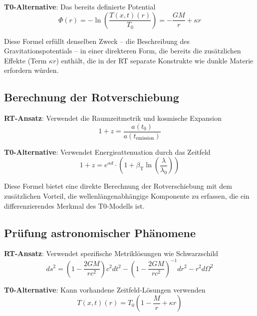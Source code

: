 \documentclass[12pt,a4paper]{article}
\newcommand{\Tfieldt}{T(x,t)}
\newcommand{\betaT}{\beta_{\text{T}}}
\newcommand{\Tzero}{T_0}
\begin{document}
	\textbf{T0-Alternative}: Das bereits definierte Potential
	\begin{equation}
		\Phi(r) = -\ln\left(\frac{\Tfieldt(r)}{\Tzero}\right) = -\frac{GM}{r} + \kappa r
	\end{equation}
	
	Diese Formel erfüllt denselben Zweck – die Beschreibung des Gravitationspotentials – in einer direkteren Form, die bereits die zusätzlichen Effekte (Term $\kappa r$) enthält, die in der RT separate Konstrukte wie dunkle Materie erfordern würden.
	
	\subsection{Berechnung der Rotverschiebung}
	\label{subsec:redshift}
	
	\textbf{RT-Ansatz}: Verwendet die Raumzeitmetrik und kosmische Expansion
	\begin{equation}
		1+z = \frac{a(t_0)}{a(t_{\text{emission}})}
	\end{equation}
	
	\textbf{T0-Alternative}: Verwendet Energieattenuation durch das Zeitfeld
	\begin{equation}
		1+z = e^{\alpha d} \cdot \left(1 + \betaT \ln\left(\frac{\lambda}{\lambda_0}\right)\right)
	\end{equation}
	
	Diese Formel bietet eine direkte Berechnung der Rotverschiebung mit dem zusätzlichen Vorteil, die wellenlängenabhängige Komponente zu erfassen, die ein differenzierendes Merkmal des T0-Modells ist.
	
	\subsection{Prüfung astronomischer Phänomene}
	\label{subsec:astronomical_phenomena}
	
	\textbf{RT-Ansatz}: Verwendet spezifische Metriklösungen wie Schwarzschild
	\begin{equation}
		ds^2 = \left(1-\frac{2GM}{rc^2}\right)c^2dt^2 - \left(1-\frac{2GM}{rc^2}\right)^{-1}dr^2 - r^2d\Omega^2
	\end{equation}
	
	\textbf{T0-Alternative}: Kann vorhandene Zeitfeld-Lösungen verwenden
	\begin{equation}
		\Tfieldt(r) = \Tzero\left(1 - \frac{M}{r} + \kappa r\right)
	\end{equation}
	
\end{document}
